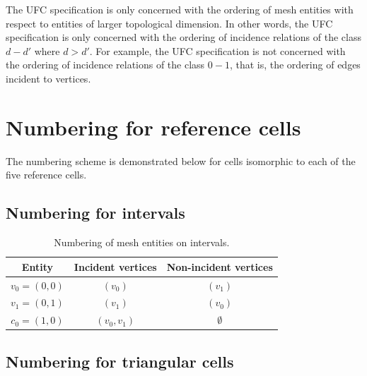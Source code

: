 The UFC specification is only concerned with the ordering of mesh
entities with respect to entities of larger topological dimension. In
other words, the UFC specification is only concerned with the ordering
of incidence relations of the class $d - d'$ where $d > d'$. For
example, the UFC specification is not concerned with the ordering of
incidence relations of the class $0 - 1$, that is, the ordering of
edges incident to vertices.

\newpage

\section{Numbering for reference cells}

The numbering scheme is demonstrated below for cells
isomorphic to each of the five reference cells.

\subsection{Numbering for intervals}

\begin{table}[H]
\linespread{1.2}\selectfont
  \begin{center}
    \begin{tabular}{|c|c|c|}
      \hline
      Entity & Incident vertices & Non-incident vertices \\
      \hline
      \hline
      $v_0 = (0, 0)$ & $(v_0)$ & $(v_1)$ \\
      \hline
      $v_1 = (0, 1)$ & $(v_1)$ & $(v_0)$ \\
      \hline
      $c_0 = (1, 0)$ & $(v_0, v_1)$ & $\emptyset$ \\
      \hline
    \end{tabular}
    \caption{Numbering of mesh entities on intervals.}
    \label{tab:interval,entities}
  \end{center}
\end{table}

\subsection{Numbering for triangular cells}

